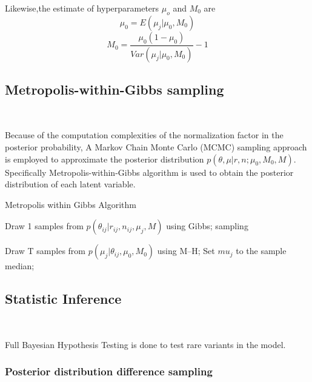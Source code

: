 \documentclass[11pt,reqno]{amsart}
\begin{document}
Likewise,the estimate of hyperparameters $\mu_o$ and $M_0$ are
\begin{equation}
 \mu_0=E(\mu_j|\mu_0,M_0)
\end{equation}
\begin{equation}
 M_0=\frac{\mu_0(1-\mu_0)}{Var(\mu_j|\mu_0,M_0)}-1
\end{equation}

\subsection{Metropolis-within-Gibbs sampling}\

Because of the computation complexities of the normalization factor in the posterior probability, A Markov Chain Monte Carlo (MCMC) sampling approach is employed to approximate the posterior distribution $p(\theta, \mu | r,n; \mu_0,M_0,M)$. Specifically Metropolis-within-Gibbs algorithm is used to obtain the posterior distribution of each latent variable.

\begin{algorithm}[ht]
\caption{Metropolis within Gibbs Algorithm}
\label{alg:metro_gibbs}
\begin{algorithmic}[1]
\Repeat
{}
	\State Draw 1 samples from $p \left( \theta_{ij} |r_{ij},n_{ij},\mu_j,M \right)$ using Gibbs; sampling
  \EndFor
\EndFor

	\State Draw T samples from $p \left( \mu_j |\theta_{ij},\mu_0,M_0\right)$ using M--H;
	\State Set $mu_j$ to the sample median;
\EndFor
{}

\end{algorithmic}
\end{algorithm}

\subsection{Statistic Inference}\

Full Bayesian Hypothesis Testing is done to test rare variants in the model.

\subsubsection{Posterior distribution difference sampling}\
\end{document}
